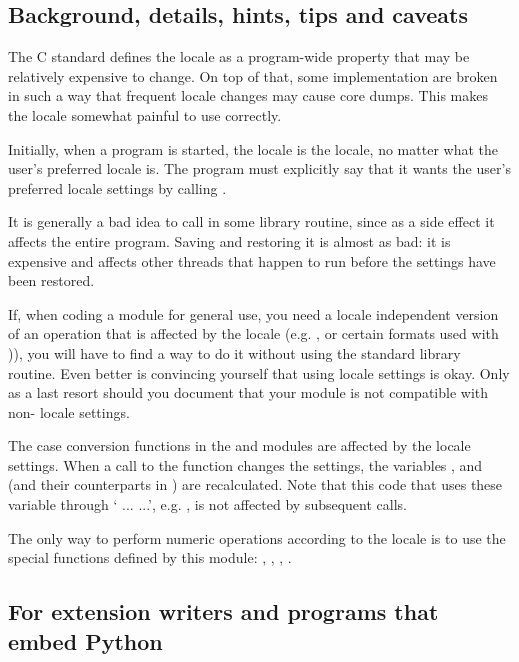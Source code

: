 \subsection{Background, details, hints, tips and caveats}

The C standard defines the locale as a program-wide property that may
be relatively expensive to change.  On top of that, some
implementation are broken in such a way that frequent locale changes
may cause core dumps.  This makes the locale somewhat painful to use
correctly.

Initially, when a program is started, the locale is the  locale, no
matter what the user's preferred locale is.  The program must
explicitly say that it wants the user's preferred locale settings by
calling .

It is generally a bad idea to call  in some library
routine, since as a side effect it affects the entire program.  Saving
and restoring it is almost as bad: it is expensive and affects other
threads that happen to run before the settings have been restored.

If, when coding a module for general use, you need a locale
independent version of an operation that is affected by the locale
(e.g. , or certain formats used with
)), you will have to find a way to do it
without using the standard library routine.  Even better is convincing
yourself that using locale settings is okay.  Only as a last resort
should you document that your module is not compatible with
non- locale settings.

The case conversion functions in the
 and
 modules are affected by the locale
settings.  When a call to the  function changes
the  settings, the variables
,  and
 (and their counterparts in ) are
recalculated.  Note that this code that uses these variable through
` ...  ...', e.g. , is not affected by subsequent 
calls.

The only way to perform numeric operations according to the locale
is to use the special functions defined by this module:
, , ,
.

\subsection{For extension writers and programs that embed Python}
\label{embedding-locale}

